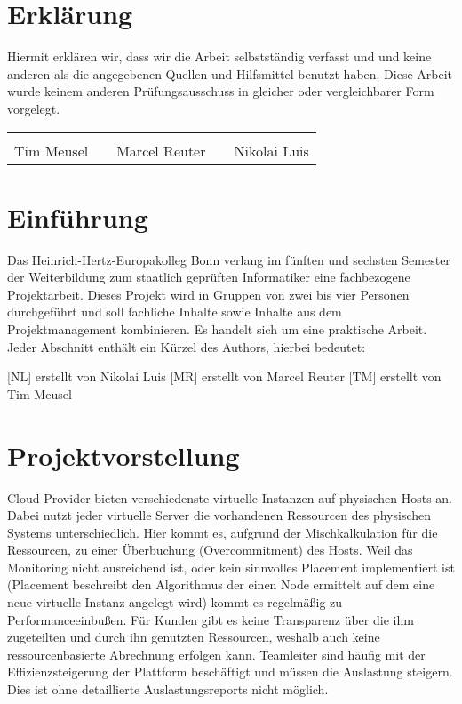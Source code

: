 \section{Erklärung}
Hiermit erklären wir, dass wir die Arbeit selbstständig verfasst und und keine
anderen als die angegebenen Quellen und Hilfsmittel benutzt haben. Diese Arbeit
wurde keinem anderen Prüfungsausschuss in gleicher oder vergleichbarer Form
vorgelegt.

\vfill
{\centering
\renewcommand{\arraystretch}{0.9}
\begin{tabular}{p{}p{}p{}p{}p{}}
  \dotfill                    & & \dotfill                      & & \dotfill \\
  \centering\footnotesize{Tim Meusel}& & \centering\footnotesize{Marcel Reuter}& & \centering\footnotesize{Nikolai Luis}%
\end{tabular}
}

\newpage

\section{Einführung}
Das Heinrich-Hertz-Europakolleg Bonn verlang im fünften und sechsten Semester
der Weiterbildung zum staatlich geprüften Informatiker eine fachbezogene
Projektarbeit. Dieses Projekt wird in Gruppen von zwei bis vier Personen
durchgeführt und soll fachliche Inhalte sowie Inhalte aus dem Projektmanagement
kombinieren. Es handelt sich um eine praktische Arbeit. Jeder Abschnitt enthält
ein Kürzel des Authors, hierbei bedeutet:
\begin{outline}
  \1 {[NL]} erstellt von Nikolai Luis
  \1 {[MR]} erstellt von Marcel Reuter
  \1 {[TM]} erstellt von Tim Meusel
\end{outline}
\tm%

\section{Projektvorstellung}
Cloud Provider bieten verschiedenste virtuelle Instanzen auf physischen Hosts
an. Dabei nutzt jeder virtuelle Server die vorhandenen Ressourcen des
physischen Systems unterschiedlich. Hier kommt es, aufgrund der
Mischkalkulation für die Ressourcen, zu einer Überbuchung (Overcommitment) des
Hosts. Weil das Monitoring nicht ausreichend ist, oder kein sinnvolles
Placement implementiert ist (Placement beschreibt den Algorithmus der einen
Node ermittelt auf dem eine neue virtuelle Instanz angelegt wird) kommt es
regelmäßig zu Performanceeinbußen. Für Kunden gibt es keine Transparenz über
die ihm zugeteilten und durch ihn genutzten Ressourcen, weshalb auch keine
ressourcenbasierte Abrechnung erfolgen kann. Teamleiter sind häufig mit der
Effizienzsteigerung der Plattform beschäftigt und müssen die Auslastung
steigern. Dies ist ohne detaillierte Auslastungsreports nicht möglich.

